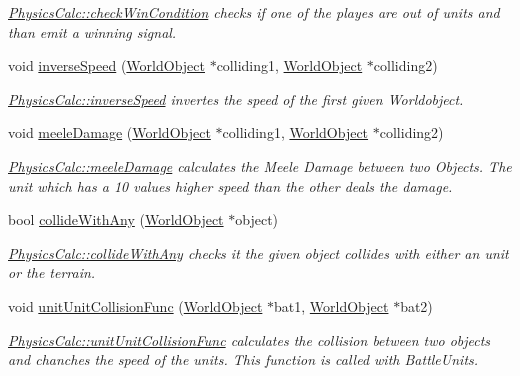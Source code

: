 \begin{DoxyCompactItemize}
\begin{DoxyCompactList}\small\item\em \hyperlink{class_physics_calc_a611a891e2f01de112884cc09f25d1e33}{Physics\+Calc\+::check\+Win\+Condition} checks if one of the playes are out of units and than emit a winning signal. \end{DoxyCompactList}\item 
void \hyperlink{class_physics_calc_a22379e7ef119411e03fc8c4ba211c724}{inverse\+Speed} (\hyperlink{class_world_object}{World\+Object} $\ast$colliding1, \hyperlink{class_world_object}{World\+Object} $\ast$colliding2)
\begin{DoxyCompactList}\small\item\em \hyperlink{class_physics_calc_a22379e7ef119411e03fc8c4ba211c724}{Physics\+Calc\+::inverse\+Speed} invertes the speed of the first given Worldobject. \end{DoxyCompactList}\item 
void \hyperlink{class_physics_calc_a10a603c3fb290521b301a19600c067c4}{meele\+Damage} (\hyperlink{class_world_object}{World\+Object} $\ast$colliding1, \hyperlink{class_world_object}{World\+Object} $\ast$colliding2)
\begin{DoxyCompactList}\small\item\em \hyperlink{class_physics_calc_a10a603c3fb290521b301a19600c067c4}{Physics\+Calc\+::meele\+Damage} calculates the Meele Damage between two Objects. The unit which has a 10 values higher speed than the other deals the damage. \end{DoxyCompactList}\item 
bool \hyperlink{class_physics_calc_a8529b4af50316ef96a6bcbd029c39077}{collide\+With\+Any} (\hyperlink{class_world_object}{World\+Object} $\ast$object)
\begin{DoxyCompactList}\small\item\em \hyperlink{class_physics_calc_a8529b4af50316ef96a6bcbd029c39077}{Physics\+Calc\+::collide\+With\+Any} checks it the given object collides with either an unit or the terrain. \end{DoxyCompactList}\item 
void \hyperlink{class_physics_calc_aacab28a38556f2a29e52068f09a3a4f0}{unit\+Unit\+Collision\+Func} (\hyperlink{class_world_object}{World\+Object} $\ast$bat1, \hyperlink{class_world_object}{World\+Object} $\ast$bat2)
\begin{DoxyCompactList}\small\item\em \hyperlink{class_physics_calc_aacab28a38556f2a29e52068f09a3a4f0}{Physics\+Calc\+::unit\+Unit\+Collision\+Func} calculates the collision between two objects and chanches the speed of the units. This function is called with Battle\+Units. \end{DoxyCompactList}\item 

\end{DoxyCompactItemize}
